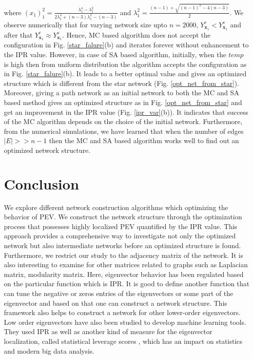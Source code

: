 \documentclass[envcountreset,oribibl]{llncs}
\begin{document}
where $(x_1)_1^2=\frac{\lambda_1^4 - \lambda_1^2}{2\lambda_1^4+(n-3)\lambda_1^2-(n-3)}$ and $\lambda_1^2= \frac{(n-1)+\sqrt{(n-1)^2-4(n-3)}}{2}$. We observe numerically that for varying network size upto $n=2000$, $Y_{\bm{x}_1}^{c} < Y_{\bm{x}_1}^{s}$ and after that $Y_{\bm{x}_1}^{c} \approx Y_{\bm{x}_1}^{s}$. Hence, MC based algorithm does not accept the configuration in Fig. \ref{star_falure}(b) and iterates forever without enhancement to the IPR value. However, in case of SA based algorithm, initially, when the $temp$ is high then from uniform distribution the algorithm accepts the configuration as in Fig. \ref{star_falure}(b). It leads to a better optimal value and gives an optimized structure which is different from the star network (Fig. \ref{opt_net_from_star}). Moreover, giving a path network as an initial network to both the MC and SA based method gives an optimized structure as in Fig. \ref{opt_net_from_star} and get an improvement in the IPR value (Fig. \ref{ipr_var}(b)). It indicates that success of the MC algorithm depends on the choice of the initial network. Furthermore, from the numerical simulations, we have learned that when the number of edges $|E| >> n-1$ then the MC and SA based algorithm works well to find out an optimized network structure. 

\section{Conclusion}
We explore different network construction algorithms which optimizing the behavior of PEV. We construct the network structure through the optimization process that possesses highly localized PEV quantified by the IPR value. This approach provides a comprehensive way to investigate not only the optimized network but also intermediate networks before an optimized structure is found. 
Furthermore, we restrict our study to the adjacency matrix of the network. It is also interesting to examine for other matrices related to graphs such as Laplacian matrix, modularity matrix. 
Here, eigenvector behavior has been regulated based on the particular function which is IPR. It is good to define another function that can tune the negative or zeros entries of the eigenvectors or some part of the eigenvector and based on that one can construct a network structure. This framework also helps to construct a network for other lower-order eigenvectors. Low order eigenvectors have also been studied to develop machine learning tools. They used IPR as well as another kind of measure for the eigenvector localization, called statistical leverage scores \cite{low_order_evec_2013}, \cite{leverage_score_2011} which has an impact on statistics and modern big data analysis.
\end{document}
